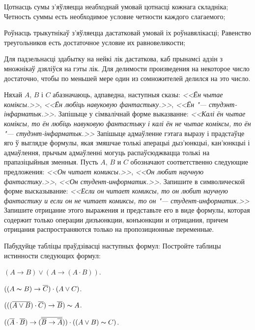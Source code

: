\begin{problemList}
\begin{belarusianEnumerate}
\problemItemSimple
{Цотнасць сумы з'яўляецца неабходнай умовай цотнасці кожнага складніка;}
{Четность суммы есть необходимое условие четности каждого слагаемого;}

\problemItemSimple
{Роўнасць трыкутнікаў з'яўляецца дастатковай умовай іх роўнавялікасці;}
{Равенство треугольников есть достаточное условие их равновеликости;}

\problemItemSimple
{Для падзельнасці здабытку на нейкі лік дастаткова, каб прынамсі адзін з множнікаў дзяліўся на гэты лік.}
{Для делимости произведения на некоторое число достаточно, чтобы по меньшей мере один из сомножителей делился на это число.}

\end{belarusianEnumerate}

\smallskip

\problemItemSimple
{Няхай $A$, $B$ і $C$ абазначаюць, адпаведна, наступныя сказы:
\textit{<<Ён чытае коміксы.>>},
\textit{<<Ён любіць навуковую фантастыку.>>},
\textit{<<Ён "--- студэнт-інфарматык.>>}.
Запішыце у сімвалічнай форме выказванне: \textit{<<Калі ён чытае коміксы,
то ён любіць навуковую фантастыку і калі ён не чытае коміксы, то ён "---
студэнт-інфарматык.>>} Запішыце адмаўленне гэтага выразу і прадстаўце яго ў выглядзе формулы,
якая змяшчае толькі аперацыі дыз'юнкцыі, кан'юнкцыі і адмаўлення, прычым адмаўленні могуць распаўсюджвацца
толькі на прапазіцыйныя зменныя.}
{Пусть $A$, $B$ и $C$ обозначают соответственно следующие предложения:
\textit{<<Он читает комиксы.>>},
\textit{<<Он любит научную фантастику.>>},
\textit{<<Он студент-информатик.>>}.
Запишите в символической форме высказывание: \textit{<<Если он читает
комиксы, то он любит научную фантастику и если он не читает комиксы, то он "---
студент-информатик.>>} Запишите отрицание этого выражения и представьте
его в виде формулы, которая содержит только операции дизъюнкции, конъюнкции и
отрицания, причем отрицания распространяются только на пропозиционные переменные.}

\bigskip

\problemItemWithCommonPart
{Пабудуйце табліцы праўдзівасці наступных формул:}
{Постройте таблицы истинности следующих формул:}
{%
\begin{belarusianEnumerate}
	\item $(A \to B) \vee (A \to (A \cdot B))$.
	\item $((A \thicksim B) \to \overline{C}) \cdot (A \vee C)$.
	\item $(((\overline{A \vee B}) \cdot \overline{C}) \to \overline{B}) \thicksim A$.
	\item $((\overline{A} \cdot \overline{B}) \to (\overline{\overline{B} \to \overline{A}}))
\cdot ((A \vee B) \thicksim C)$.
\end{belarusianEnumerate}
}


\end{problemList}
